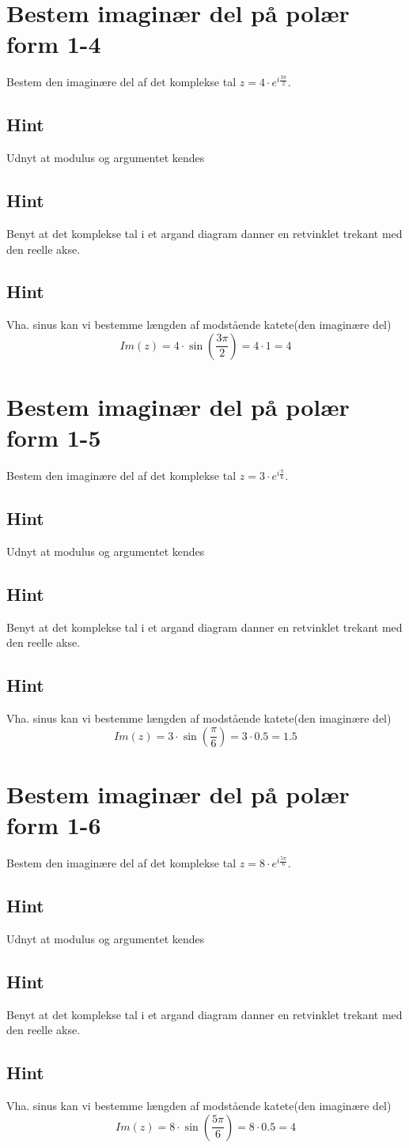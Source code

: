 \documentclass{article}
\newenvironment{exercise}[1]{\newpage\section{#1}}{}
\newcommand{\answerbox}[1]{\fbox{$#1$}}
\newcommand{\hint}{\subsection*{Hint}}
\begin{document}
\newpage

\begin{exercise}{Bestem imaginær del på polær form 1-4}
	
	Bestem den imaginære del af det komplekse tal $z=4 \cdot e^{i \frac{3 \pi}{2}}$.

	\answerbox{4}


	\hint 

	Udnyt at modulus og argumentet kendes


	\hint

	Benyt at det komplekse tal i et argand diagram danner en retvinklet trekant med den reelle akse. 

	\hint 

	Vha. sinus kan vi bestemme længden af modstående katete(den imaginære del)
	\[
	Im(z) =  4 \cdot \sin\left(\frac{3 \pi}{2}\right) = 4 \cdot 1 = 4
	\]
	\end{exercise}

\newpage

\begin{exercise}{Bestem imaginær del på polær form 1-5}
	
	Bestem den imaginære del af det komplekse tal $z=3 \cdot e^{i \frac{\pi}{6}}$.
	
	\answerbox{1.5}
	
	
	\hint 
	
	Udnyt at modulus og argumentet kendes
	
	
	\hint
	
	Benyt at det komplekse tal i et argand diagram danner en retvinklet trekant med den reelle akse. 
	
	\hint 
	
	Vha. sinus kan vi bestemme længden af modstående katete(den imaginære del)
	\[
	Im(z) =  3 \cdot \sin\left(\frac{\pi}{6}\right) = 3 \cdot 0.5 = 1.5
	\]
	
\end{exercise}

\newpage

\begin{exercise}{Bestem imaginær del på polær form 1-6}
	
	Bestem den imaginære del af det komplekse tal $z=8 \cdot e^{i \frac{5 \pi}{6}}$.
	
	\answerbox{4}
	
	
	\hint 
	
	Udnyt at modulus og argumentet kendes
	
	
	\hint
	
	Benyt at det komplekse tal i et argand diagram danner en retvinklet trekant med den reelle akse. 
	
	\hint 
	
	Vha. sinus kan vi bestemme længden af modstående katete(den imaginære del)
	\[
	Im(z) =  8 \cdot \sin\left(\frac{5\pi}{6}\right) = 8 \cdot 0.5 = 4
	\]
	
\end{exercise}
\end{document}
